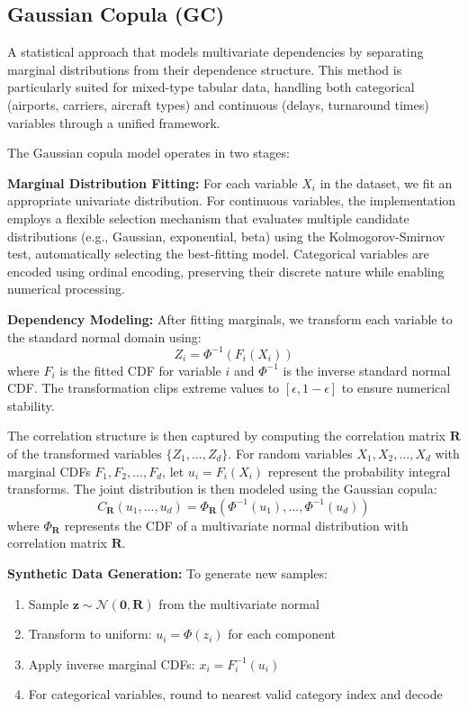 \documentclass[conference]{IEEEtran}
\begin{document}
\subsection{Gaussian Copula (GC)}
A statistical approach that models multivariate dependencies by separating marginal distributions from their dependence structure. This method is particularly suited for mixed-type tabular data, handling both categorical (airports, carriers, aircraft types) and continuous (delays, turnaround times) variables through a unified framework.

The Gaussian copula model operates in two stages:

\textbf{Marginal Distribution Fitting:} For each variable $X_i$ in the dataset, we fit an appropriate univariate distribution. For continuous variables, the implementation employs a flexible selection mechanism that evaluates multiple candidate distributions (e.g., Gaussian, exponential, beta) using the Kolmogorov-Smirnov test, automatically selecting the best-fitting model. Categorical variables are encoded using ordinal encoding, preserving their discrete nature while enabling numerical processing.

\textbf{Dependency Modeling:} After fitting marginals, we transform each variable to the standard normal domain using:
\begin{equation}
Z_i = \Phi^{-1}(F_i(X_i))
\end{equation}
where $F_i$ is the fitted CDF for variable $i$ and $\Phi^{-1}$ is the inverse standard normal CDF. The transformation clips extreme values to $[\epsilon, 1-\epsilon]$ to ensure numerical stability.

The correlation structure is then captured by computing the correlation matrix $\mathbf{R}$ of the transformed variables $\{Z_1, ..., Z_d\}$. For random variables $X_1, X_2, \ldots, X_d$ with marginal CDFs $F_1, F_2, \ldots, F_d$, let $u_i = F_i(X_i)$ represent the probability integral transforms. The joint distribution is then modeled using the Gaussian copula:
\begin{equation}
C_{\mathbf{R}}(u_1, ..., u_d) = \Phi_{\mathbf{R}}(\Phi^{-1}(u_1), ..., \Phi^{-1}(u_d))
\end{equation}
where $\Phi_{\mathbf{R}}$ represents the CDF of a multivariate normal distribution with correlation matrix $\mathbf{R}$.


\textbf{Synthetic Data Generation:} To generate new samples:
\begin{enumerate}
    \item Sample $\mathbf{z} \sim \mathcal{N}(\mathbf{0}, \mathbf{R})$ from the multivariate normal
    \item Transform to uniform: $u_i = \Phi(z_i)$ for each component
    \item Apply inverse marginal CDFs: $x_i = F_i^{-1}(u_i)$
    \item For categorical variables, round to nearest valid category index and decode
\end{enumerate}
\end{document}
